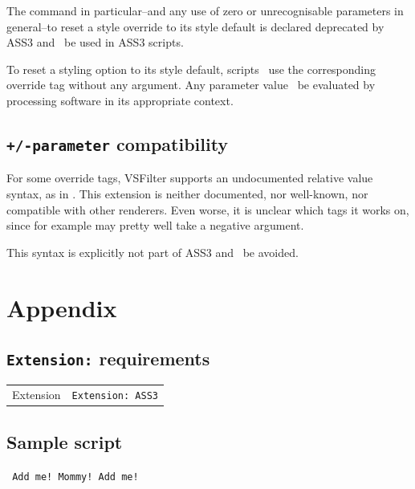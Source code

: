 \documentclass{spec}
\gdef\compat{}
\begin{document}
The  command in particular--and any use of zero or unrecognisable
parameters in general--to reset a style override to its style default is
declared deprecated by ASS3 and \mustnot\ be used in ASS3 scripts.

To reset a styling option to its style default, scripts \may\ use the
corresponding override tag without any argument. Any parameter value
\must\ be evaluated by processing software in its appropriate context.

\subsection{\texttt{+/-parameter} compatibility}

For some override tags, VSFilter supports an undocumented relative value
syntax, as in . This extension is neither documented, nor well-known,
nor compatible with other renderers. Even worse, it is unclear which tags
it works on, since for example  may pretty well take a negative
argument.

This syntax is explicitly not part of ASS3 and \should\ be avoided.

\appendix
\section{Appendix}
\subsection{\texttt{Extension:} requirements}

\begin{tabular}{ll}
Extension & \texttt{Extension:~ASS3}\\[6pt]
\compat
\end{tabular}

\subsection{\todo Sample script}

\texttt{\footnotesize
Add me! Mommy! Add me!
}
\end{document}
